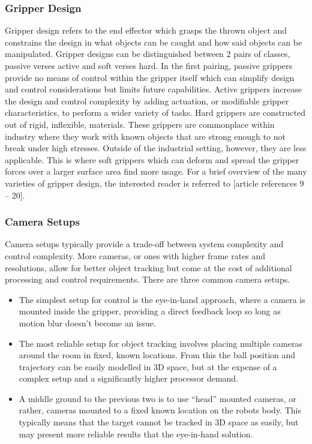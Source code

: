 \documentclass[conference]{IEEEtran}
\begin{document}
\subsubsection{Gripper Design}
Gripper design refers to the end effector which grasps the thrown object and constrains the design in what objects can be caught and how said objects can be manipulated. Gripper designs can be distinguished between 2 pairs of classes, passive verses active and soft verses hard.
In the first pairing, passive grippers provide no means of control within the gripper itself which can simplify design and control considerations but limits future capabilities. Active grippers increase the design and control complexity by adding actuation, or modifiable gripper characteristics, to perform a wider variety of tasks.
Hard grippers are constructed out of rigid, inflexible, materials. These grippers are commonplace within industry where they work with known objects that are strong enough to not break under high stresses. Outside of the industrial setting, however, they are less applicable. This is where soft grippers which can deform and spread the gripper forces over a larger surface area find more usage.
For a brief overview of the many varieties of gripper design, the interested reader is referred to [article references 9 – 20].

\subsubsection{Camera Setups}
Camera setups typically provide a trade-off between system complexity and control complexity. More cameras, or ones with higher frame rates and resolutions, allow for better object tracking but come at the cost of additional processing and control requirements.
There are three common camera setups.
\begin{itemize}
	\item The simplest setup for control is the eye-in-hand approach, where a camera is mounted inside the gripper, providing a direct feedback loop so long as motion blur doesn’t become an issue.
	\item The most reliable setup for object tracking involves placing multiple cameras around the room in fixed, known locations. From this the ball position and trajectory can be easily modelled in 3D space, but at the expense of a complex setup and a significantly higher processor demand.
	\item A middle ground to the previous two is to use “head” mounted cameras, or rather, cameras mounted to a fixed known location on the robots body. This typically means that the target cannot be tracked in 3D space as easily, but may present more reliable results that the eye-in-hand solution. 
\end{itemize}
\end{document}
